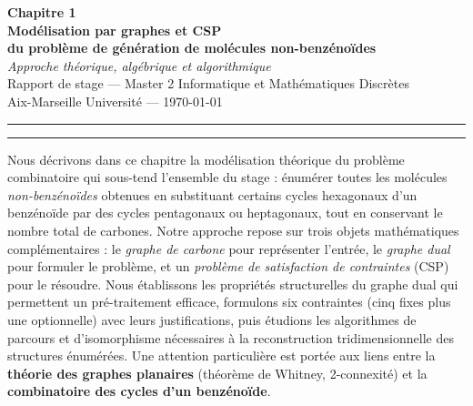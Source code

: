 \documentclass[12pt,a4paper]{article}
\theoremstyle{definition}
\theoremstyle{remark}
\begin{document}
\begin{center}
  {\LARGE\bfseries\color{bleuTitre}
    Chapitre 1\\[6pt]
    Mod\'elisation par graphes et CSP\\[4pt]
    du probl\`eme de g\'en\'eration de mol\'ecules non-benz\'eno\"ides}\\[18pt]
  {\large\itshape
    Approche th\'eorique, alg\'ebrique et algorithmique}\\[14pt]
  {\small Rapport de stage --- Master 2 Informatique et Math\'ematiques Discr\`etes}\\[2pt]
  {\small Aix-Marseille Universit\'e --- \today}
\end{center}

\vspace{8pt}
\rule{\linewidth}{1pt}
\vspace{4pt}

\tableofcontents

\vspace{10pt}
\rule{\linewidth}{0.4pt}
\vspace{8pt}

\begin{notebox}
Nous d\'ecrivons dans ce chapitre la mod\'elisation th\'eorique du probl\`eme
combinatoire qui sous-tend l'ensemble du stage : \'enum\'erer toutes les
mol\'ecules \emph{non-benz\'eno\"ides} obtenues en substituant certains cycles
hexagonaux d'un benz\'eno\"ide par des cycles pentagonaux ou heptagonaux,
tout en conservant le nombre total de carbones. Notre approche repose sur
trois objets math\'ematiques compl\'ementaires : le \emph{graphe de
carbone} pour repr\'esenter l'entr\'ee, le \emph{graphe dual} pour
formuler le probl\`eme, et un \emph{probl\`eme de satisfaction de
contraintes} (CSP) pour le r\'esoudre. Nous \'etablissons les propri\'et\'es
structurelles du graphe dual qui permettent un pr\'e-traitement efficace,
formulons six contraintes (cinq fixes plus une optionnelle) avec leurs
justifications, puis \'etudions les algorithmes de parcours et d'isomorphisme
n\'ecessaires \`a la reconstruction tridimensionnelle des structures
\'enum\'er\'ees. Une attention particuli\`ere est port\'ee aux liens entre la
\textbf{th\'eorie des graphes planaires} (th\'eor\`eme de Whitney,
2-connexit\'e) et la \textbf{combinatoire des cycles d'un benz\'eno\"ide}.
\end{notebox}
\end{document}
